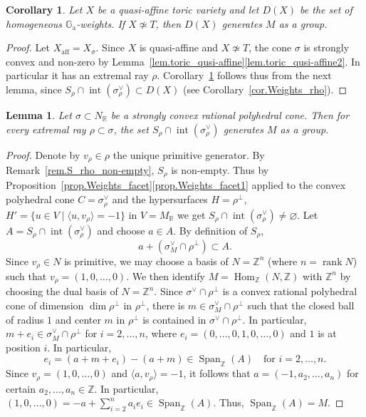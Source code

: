 \documentclass[JEP,XML,SOM,Unicode]{cedram}
\newcommand{\ra}{\mathrm{a}}
\let\oldvee\vee
\renewcommand{\vee}{{\scriptscriptstyle\oldvee}}
\let\oldbot\bot
\renewcommand{\bot}{{\scriptscriptstyle\oldbot}}
\theoremstyle{plain}
\newtheorem{lemma}[theorem]{Lemma}
\newtheorem{corollary}[theorem]{Corollary}
\theoremstyle{definition}
\DeclareMathOperator{\Hom}{Hom}
\DeclareMathOperator{\rank}{rank}
\DeclareMathOperator{\aff}{aff}
\DeclareMathOperator{\Span}{Span}
\DeclareMathOperator{\inter}{int}
\newcommand{\GG}{\mathbb{G}}
\newcommand{\RR}{\mathbb{R}}
\newcommand{\ZZ}{\mathbb{Z}}
\newcommand{\set}[2]{\{#1 \mid #2\}}
\newcommand{\sprod}[2]{\langle #1, #2 \rangle}
\begin{document}
\begin{corollary}
\label{cor.DX_generates_M_as_a_group}
Let $X$ be a quasi-affine toric variety and let $D(X)$ be the set of
homogeneous $\GG_\ra$-weights. If
$X \not \simeq T$, then $D(X)$ generates $M$ as a group.
\end{corollary}

\begin{proof}
Let $X_{\aff} = X_{\sigma}$.
Since $X$ is quasi-affine and $X \not\simeq T$, the cone $\sigma$ is strongly convex and
non-zero by Lemma~\ref{lem.toric_qusi-affine}\eqref{lem.toric_qusi-affine2}.
In particular it has an extremal ray $\rho$.
Corollary~\ref{cor.DX_generates_M_as_a_group} follows thus from the next lemma, since
$S_\rho \cap \inter(\sigma_{\rho}^\vee) \subset D(X)$ (see Corollary~\ref{cor.Weights_rho}).
\end{proof}

\begin{lemma}
Let $\sigma \subset N_{\RR}$ be a strongly convex rational polyhedral cone. Then for every
extremal ray $\rho \subset \sigma$, the set $S_{\rho} \cap \inter(\sigma_{\rho}^\vee)$ generates $M$ as a group.
\end{lemma}

\begin{proof}
Denote by $v_\rho \in \rho$ the unique primitive generator.
By Remark~\ref{rem.S_rho_non-empty}, $S_\rho$ is non-empty.
Thus by Proposition~\ref{prop.Weights_facet}\eqref{prop.Weights_facet1}
applied to the convex polyhedral cone $C = \sigma_{\rho}^\vee$
and the hypersurfaces $H = \rho^\bot$, $H' = \set{u \in V}{\sprod{u}{v_{\rho}}=-1}$ in $V = M_{\RR}$
we get $S_{\rho} \cap \inter(\sigma_{\rho}^\vee) \neq \varnothing$.
Let $A = S_{\rho} \cap \inter(\sigma_{\rho}^\vee)$ and choose $a \in A$.
By definition of $S_{\rho}$,
\[
a + (\sigma_M^\vee \cap \rho^\bot) \subset A.
\]
Since $v_{\rho} \in N$ is primitive,
we may choose a basis of $N = \ZZ^n$ (where $n = \rank N$) such
that $v_{\rho} = (1, 0, \ldots, 0)$. We then identify $M = \Hom_{\ZZ}(N, \ZZ)$
with $\ZZ^n$ by choosing the dual basis of $N = \ZZ^n$.
Since $\sigma^\vee \cap \rho^\bot$ is a convex rational polyhedral cone of dimension
$\dim \rho^\bot$ in $\rho^\bot$, there is $m \in \sigma_M^\vee \cap \rho^\bot$ such that
the closed ball of radius $1$ and center $m$ in $\rho^\bot$ is contained in
$\sigma^\vee \cap \rho^\bot$. In particular, $m + e_i \in \sigma_M^\vee \cap \rho^\bot$
for $i =2, \ldots, n$, where $e_i = (0, \ldots, 0, 1, 0, \ldots, 0)$ and $1$ is at position $i$.
In particular,
\[
e_i = (a + m + e_i) - (a+m) \in \Span_{\ZZ}(A) \quad \textrm{for $i=2, \ldots, n$}.
\]
Since $v_\rho = (1, 0, \ldots, 0)$ and $\sprod{a}{v_{\rho}} = -1$, it follows that
$a = (-1, a_2, \ldots, a_n)$ for certain $a_2, \ldots, a_n \in \ZZ$.
In particular, $(1, 0, \ldots, 0) = -a + \sum_{i=2}^n a_i e_i \in \Span_{\ZZ}(A)$.
Thus, $\Span_{\ZZ}(A) = M$.
\end{proof}
\end{document}
